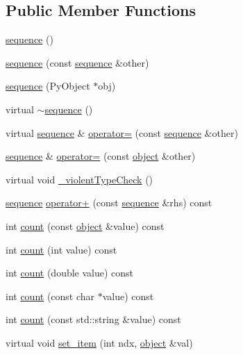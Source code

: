 \subsection*{Public Member Functions}
\begin{DoxyCompactItemize}
\item 
\hyperlink{classpy_1_1sequence_a672c69c509337cbdd806d95af37e7629}{sequence} ()
\item 
\hyperlink{classpy_1_1sequence_ad133e3ca57f729a4a4605c580a7fc9e2}{sequence} (const \hyperlink{classpy_1_1sequence}{sequence} \&other)
\item 
\hyperlink{classpy_1_1sequence_aebda68e86f9acd5a317d15d4d25fa383}{sequence} (Py\+Object $\ast$obj)
\item 
virtual \hyperlink{classpy_1_1sequence_a31c31849d645af12fd7eb0a3dd6ba0c3}{$\sim$sequence} ()
\item 
virtual \hyperlink{classpy_1_1sequence}{sequence} \& \hyperlink{classpy_1_1sequence_ae4a7d5878314926bfdd3bd5163a17e37}{operator=} (const \hyperlink{classpy_1_1sequence}{sequence} \&other)
\item 
\hyperlink{classpy_1_1sequence}{sequence} \& \hyperlink{classpy_1_1sequence_ac8f7dc9e54e6c23473733ee7221a9e35}{operator=} (const \hyperlink{classpy_1_1object}{object} \&other)
\item 
virtual void \hyperlink{classpy_1_1sequence_a2e3261838b8b06dc6760c51c1d5f7b4d}{\+\_\+violent\+Type\+Check} ()
\item 
\hyperlink{classpy_1_1sequence}{sequence} \hyperlink{classpy_1_1sequence_a6800292a3608f7db69fd03fb794fd342}{operator+} (const \hyperlink{classpy_1_1sequence}{sequence} \&rhs) const 
\item 
int \hyperlink{classpy_1_1sequence_a4bf58c29f02b2ea72f820ca296eae790}{count} (const \hyperlink{classpy_1_1object}{object} \&value) const 
\item 
int \hyperlink{classpy_1_1sequence_a7d50e2f7e9b87d992958667e367b7088}{count} (int value) const 
\item 
int \hyperlink{classpy_1_1sequence_af3c20c77d8d1ee07920b29fc69899694}{count} (double value) const 
\item 
int \hyperlink{classpy_1_1sequence_a3ee112309c0476dc9db14cdb2d1b5da9}{count} (const char $\ast$value) const 
\item 
int \hyperlink{classpy_1_1sequence_ad65ce238ec16cda59bf433bd2e67d19c}{count} (const std\+::string \&value) const 
\item 
virtual void \hyperlink{classpy_1_1sequence_a6e059f2d64a97bf511fe656d789c1f21}{set\+\_\+item} (int ndx, \hyperlink{classpy_1_1object}{object} \&val)

\end{DoxyCompactItemize}
